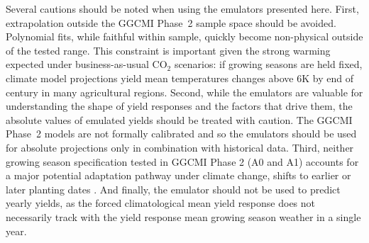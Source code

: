 \documentclass[gmdd]{copernicus} %
\begin{document}
Several cautions should be noted when using the emulators presented here. 
First, extrapolation outside the GGCMI Phase~2 sample space should be avoided.
Polynomial fits, while faithful within sample, quickly become non-physical outside of the tested range. 
This constraint is important given the strong warming expected under business-as-usual CO$_2$ scenarios: if growing seasons are held fixed, climate model projections yield mean temperatures changes above 6K by end of century in many agricultural regions. 
Second, while the emulators are valuable for understanding the shape of yield responses and the factors that drive them, the absolute values of emulated yields should be treated with caution. 
The GGCMI Phase~2 models are not formally calibrated and so the emulators should be used for absolute projections only in combination with historical data.
Third, neither growing season specification tested in GGCMI Phase 2 (A0 and A1) accounts for a major potential adaptation pathway under climate change, shifts to earlier or later planting dates \citep{waha2012,minoli2019modeling}. 
And finally, the emulator should not be used to predict yearly yields, as the forced climatological mean yield response does not necessarily track with the yield response mean growing season weather in a single year.
\end{document}
